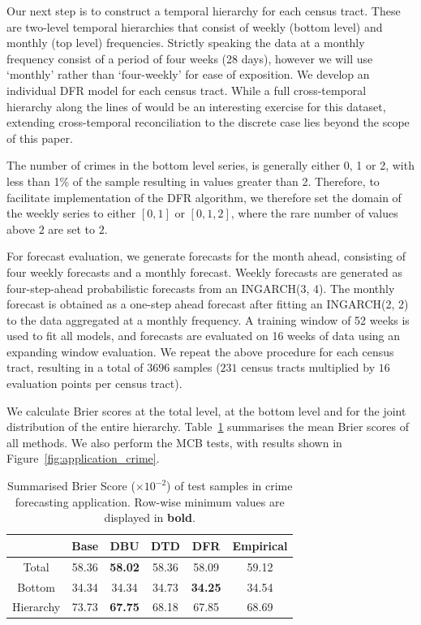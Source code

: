 \documentclass[a4paper,review,12pt,authoryear]{elsarticle}
\theoremstyle{definition}
\begin{document}
     
     Our next step is to construct a temporal hierarchy for each census tract. These are two-level temporal hierarchies that consist of weekly (bottom level) and monthly (top level) frequencies. Strictly speaking the data at a monthly frequency consist of a period of four weeks (28 days), however we will use `monthly' rather than `four-weekly' for ease of exposition. We develop an individual DFR model for each census tract. While a full cross-temporal hierarchy along the lines of \cite{kourentzesCrosstemporalCoherentForecasts2019} would be an interesting exercise for this dataset, extending cross-temporal reconciliation to the discrete case lies beyond the scope of this paper.
     
     The number of crimes in the bottom level series, is generally either 0, 1 or 2, with less than 1\% of the sample resulting in values greater than 2. Therefore, to facilitate implementation of the DFR algorithm, we therefore set the domain of the weekly series to either $[0, 1]$ or $[0, 1, 2]$, where the rare number of values above $2$ are set to $2$.

     For forecast evaluation, we generate forecasts for the month ahead, consisting of four weekly forecasts and a monthly forecast. Weekly forecasts are generated as four-step-ahead probabilistic forecasts from an INGARCH(3, 4). The monthly forecast is obtained as a one-step ahead forecast after fitting an INGARCH(2, 2) to the data aggregated at a monthly frequency.
     A training window of 52 weeks is used to fit all models, and forecasts are evaluated on 16 weeks of data using an expanding window evaluation. We repeat the above procedure for each census tract, resulting in a total of $3696$ samples ($231$ census tracts multiplied by $16$ evaluation points per census tract).
     
     We calculate Brier scores at the total level, at the bottom level and for the joint distribution of the entire hierarchy.
     Table~\ref{tab:crime_bs} summarises the mean Brier scores of all methods. We also perform the MCB tests, with results shown in Figure~\ref{fig:application_crime}.

     \begin{table}[h]
       \centering
       \caption{\label{tab:crime_bs}Summarised Brier Score ($\times 10^{-2}$) of test samples in crime forecasting application. Row-wise minimum values are displayed in \textbf{bold}.}
       \begin{tabular}{cccccc}
       \toprule
       ~ & Base & DBU & DTD & DFR & Empirical \\\midrule 
       Total & 58.36 & \textbf{58.02} & 58.36 & 58.09 & 59.12 \\ 
       Bottom & 34.34 & 34.34 & 34.73 & \textbf{34.25} & 34.54 \\ 
       Hierarchy & 73.73 & \textbf{67.75} & 68.18 & {67.85} & 68.69 \\ 
       \bottomrule
       \end{tabular}
       \end{table}
\end{document}
